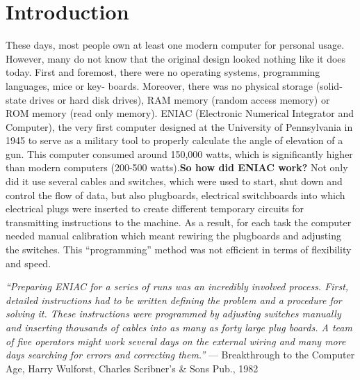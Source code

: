 \documentclass[12pt]{article}
\begin{document}
\newpage

\section{Introduction}
These days, most people own at least one modern computer for personal usage. However, many do not know that the original design looked nothing like it does today.\newline\newline
First and foremost, there were no operating systems, programming languages, mice or key- boards. Moreover, there was no physical storage (solid-state drives or hard disk drives), RAM memory (random access memory) or ROM memory (read only memory). ENIAC (Electronic Numerical Integrator and Computer), the very first computer designed at the University of Pennsylvania in 1945 to serve as a military tool to properly calculate the angle of elevation of a gun. This computer consumed around 150,000 watts, which is significantly higher than modern computers (200-500 watts).\newline\newline \textbf{So how did ENIAC work?}\newline\newline
Not only did it use several cables and switches, which were used to start, shut down and control the flow of data, but also plugboards, electrical switchboards into which electrical plugs were inserted to create different temporary circuits for transmitting instructions to the machine. As a result, for each task the computer needed manual calibration which meant rewiring the plugboards and adjusting the switches. This “programming” method was not efficient in terms of flexibility and speed.

\begin{center}
    \footnotesize\textit{“Preparing ENIAC for a series of runs was an incredibly involved process. 
    First, detailed instructions had to be written defining the problem and a procedure for solving it. 
    These instructions were programmed by adjusting switches manually and inserting thousands of cables into as many as forty large plug boards. 
    A team of five operators might work several days on the external wiring and many more days searching for errors and correcting them.”}
    — Breakthrough to the Computer Age, Harry Wulforst, Charles Scribner’s \& Sons Pub., 1982
\end{center}
\end{document}
